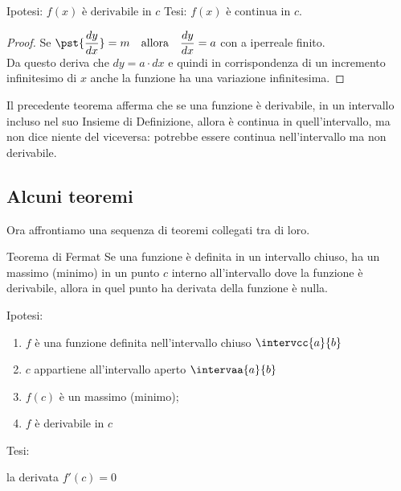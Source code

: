 \noindent Ipotesi: 
\(f(x) \text{ è derivabile in } c\)
\tab Tesi: 
\(f(x) \text{ è continua in } c\).

\begin{proof}
Se \(\pst{\dfrac{dy}{dx}}=m \quad \text{allora} \quad 
\dfrac{dy}{dx}=a\) \quad con a iperreale finito.\\
Da questo deriva che \(dy= a \cdot dx\) e quindi in corrispondenza di 
un incremento infinitesimo di \(x\) anche la funzione ha una 
variazione infinitesima.
\end{proof}
\begin{newoss}{}{}
Il precedente teorema afferma che se una funzione è derivabile, in un 
intervallo incluso nel suo Insieme di Definizione, allora è continua in 
quell'intervallo, ma non dice niente del viceversa: potrebbe essere 
continua nell'intervallo ma non derivabile.
\end{newoss}

\subsection{Alcuni teoremi}
\label{subsec:cont_teoremi}

Ora affrontiamo una sequenza di teoremi collegati tra di loro.

\begin{newtheo}{Teorema di Fermat}{}
Se una funzione è 
definita in un intervallo chiuso, 
ha un massimo (minimo) in un punto \(c\) interno all'intervallo 
dove la funzione è derivabile, 
allora in quel punto ha derivata della funzione è nulla.
\end{newtheo}

\vspace{-30mm}                           %
\begin{minipage}{.54\textwidth}
\noindent Ipotesi:
\begin{enumerate}[nosep]
 \item \(f\) è una funzione definita nell'intervallo chiuso 
\(\intervcc{a}{b}\)
 \item \(c\) appartiene all'intervallo aperto \(\intervaa{a}{b}\)
 \item \(f(c)\) è un massimo (minimo);
 \item \(f\) è derivabile in \(c\)
\end{enumerate}

\noindent Tesi: 

\hspace{4mm} la derivata \(f'(c)=0\)
\end{minipage}
\hfill
\begin{minipage}{.42\textwidth}
\begin{center} \tfermat \end{center}
\end{minipage}


